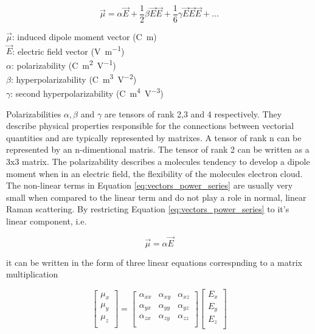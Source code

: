 \begin{equation} \label{eq:vectors_power_series}
    \overrightarrow{\mu} = \alpha \overrightarrow{E} + \frac{1}{2} \beta \overrightarrow{E}\overrightarrow{E} + \frac{1}{6} \gamma \overrightarrow{E}\overrightarrow{E}\overrightarrow{E} + \dots
\end{equation}

\(\overrightarrow{\mu} \): induced dipole moment vector (\unit{\coulomb\meter})\\
\(\overrightarrow{E} \): electric field vector (\unit{\volt\per\meter})\\
\(\alpha\): polarizability (\unit{\coulomb\meter\squared\per\volt}) \\
\(\beta\): hyperpolarizability (\unit{\coulomb\meter\cubed\per\volt\squared}) \\
\(\gamma\): second hyperpolarizability (\unit{\coulomb\meter^4\volt^{-3}}) 

\bigskip

Polarizabilities \( \alpha, \beta\) and \( \gamma\) are tensors of rank 2,3 and 4 respectively. They describe physical properties responsible for the connections between vectorial quantities and are typically represented by matrixes. A tensor of rank n can be represented by an n-dimentional matris. The tensor of rank 2 can be written as a 3x3 matrix. The polarizability describes a molecules tendency to develop a dipole moment when in an electric field, the flexibility of the molecules electron cloud. The non-linear terms in Equation \ref{eq:vectors_power_series} are usually very small when compared to the linear term and do not play a role in normal, linear Raman scattering. By restricting Equation \ref{eq:vectors_power_series} to it's linear component, i.e.


\begin{equation} \label{eq:vectors_power_series_lin}
    \overrightarrow{\mu} = \alpha \overrightarrow{E}
\end{equation}

it can be written in the form of three linear equations correspnding to a matrix multiplication

\begin{equation}
    \begin{bmatrix}
        \mu_x\\
        \mu_y\\
        \mu_z\\
    \end{bmatrix}
    = 
    \begin{bmatrix}
        \alpha_{xx} & \alpha_{xy} & \alpha_{xz} \\
        \alpha_{yx} & \alpha_{yy} & \alpha_{yz}\\
        \alpha_{zx} & \alpha_{zy} & \alpha_{zz}\\
    \end{bmatrix}
    \begin{bmatrix}
        E_x\\
        E_y\\
        E_z\\
    \end{bmatrix}
\end{equation}

